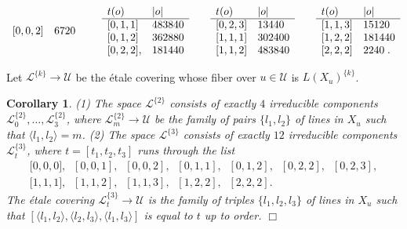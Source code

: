 \documentclass{math}
\theoremstyle{plain}
\newtheorem{corollary}[theorem]{Corollary}
\numberwithin{equation}{section}
\newcommand{\qed}{\hfill {$\Box$}}
\newcommand{\LLL}{\mathord{\mathcal L}}
\newcommand{\UUU}{\mathord{\mathcal U}}
\newcommand{\intf}[1]{\langle #1 \rangle}
\newcommand{\spset}[1]{^{\{#1\}}}
\begin{document}
\begin{itemize}[itemsep=5pt]
\begin{equation*}
\begin{array}{ll}
 {[} 0, 0, 2 {]}& 6720
 \end{array}
 \qquad
\begin{array}{ll}
t(o) & |o| \\
\hline
 {[} 0, 1, 1 {]}& 483840\\
 {[} 0, 1, 2 {]}& 362880\\
 {[} 0, 2, 2 {]},& 181440
\end{array}
%
\qquad
\begin{array}{ll}
t(o) & |o| \\
\hline
 {[} 0, 2, 3 {]}&13440 \\
{[} 1, 1, 1 {]}& 302400 \\
{[} 1, 1, 2 {]}& 483840 \\
\end{array}
\qquad
\begin{array}{ll}
t(o) & |o| \\
\hline
{[} 1, 1, 3 {]}&15120 \\
{[} 1, 2, 2 {]}& 181440 \\
{[} 2, 2, 2 {]}& 2240 \;\;\llap{.}
\end{array}
\end{equation*}
%
\end{itemize}
%
Let $\LLL\spset{k}\to \UUU$ be the \'etale covering whose fiber over $u\in \UUU$
is $L(X_u)\spset{k}$.
%
\begin{corollary}\label{cor:irred}
{\rm (1)}
The space  $\LLL\spset{2}$ consists of  exactly $4$ irreducible components
$\LLL\spset{2}_0, \dots, \LLL\spset{2}_3$, where 
 $\LLL^{\{2\}}_m\to \UUU$ be the family of 
pairs $\{l_1, l_2\}$ of lines in $X_u$ 
such that $\intf{l_1, l_2}=m$.  %
{\rm (2)}
The space $\LLL\spset{3}$ consists of exactly $12$ irreducible components
$\LLL\spset{3}_t$, where 
 $t=[t_1, t_2, t_3]$ runs through the list
%
\begin{equation}\label{eq:tenlist}
\begin{array}{l}
 {[}0,0,0{]},\;\;[0,0,1],\;\;[0,0,2],\;\;[0,1,1],\;\;[0,1,2],\;\; [0,2,2],\;\; [0,2,3], \\
 {[}1,1,1{]},\;\; [1,1,2],\;\; [1,1,3],\;\; [1,2,2],\;\; [2,2,2].
\end{array}
\end{equation}
%
The \'etale covering  $\LLL^{\{3\}}_t\to \UUU$ is the family of 
triples $\{l_1, l_2, l_3\}$ of lines in $X_u$
such that $[\intf{l_1, l_2}, \intf{l_2, l_3}, \intf{l_1, l_3}]$ is equal to  $t$ up to order.
\qed
\end{corollary}
%
\end{document}
